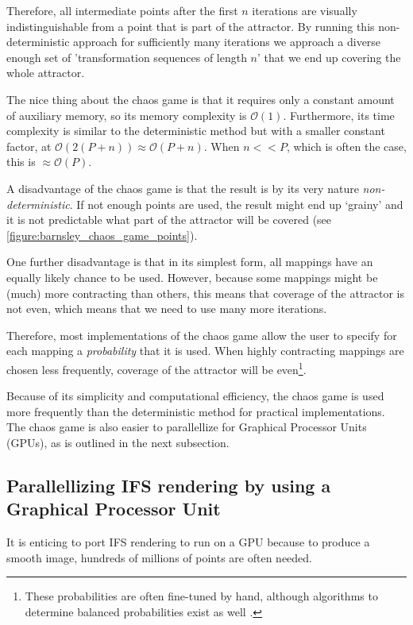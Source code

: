 \documentclass[11pt]{article}
\begin{document}
Therefore, all intermediate points after the first \(n\) iterations are visually indistinguishable from a point that is part of the attractor.
By running this non-deterministic approach for sufficiently many iterations we approach a diverse enough set of 'transformation sequences of length \(n\)' that we end up covering the whole attractor.

The nice thing about the chaos game is that it requires only a constant amount of auxiliary memory, so its memory complexity is \(\mathcal{O}(1)\).
Furthermore, its time complexity is similar to the deterministic method but with a smaller constant factor, at \(\mathcal{O}(2(P + n)) \approx \mathcal{O}(P + n)\). When \(n << P\), which is often the case, this is \(\approx \mathcal{O}(P)\).

A disadvantage of the chaos game is that the result is by its very nature \emph{non-deterministic}.
If not enough points are used, the result might end up `grainy' and it is not predictable what part of the attractor will be covered (see \autoref{figure:barnsley_chaos_game_points}).

One further disadvantage is that in its simplest form, all mappings have an equally likely chance to be used.
However, because some mappings might be (much) more contracting than others, this means that coverage of the attractor is not even,
which means that we need to use many more iterations.

Therefore, most implementations of the chaos game allow the user to specify for each mapping a \emph{probability} that it is used. 
When highly contracting mappings are chosen less frequently, coverage of the attractor will be even\footnote{These probabilities are often fine-tuned by hand, although algorithms to determine balanced probabilities exist as well \cite{hepting1991rendering}.}.

Because of its simplicity and computational efficiency, the chaos game is used more frequently than the deterministic method for practical implementations.
The chaos game is also easier to parallellize for Graphical Processor Units (GPUs), as is outlined in the next subsection.

\subsection{Parallellizing IFS rendering by using a Graphical Processor Unit}
\label{sec:org6deb60e}

It is enticing to port IFS rendering to run on a GPU because to produce a smooth image, hundreds of millions of points are often needed.
\end{document}
